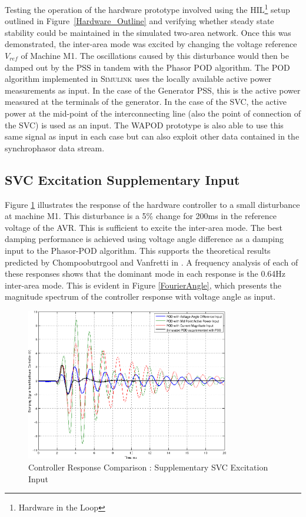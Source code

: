 \documentclass[journal]{IEEEtran}
\begin{document}
Testing the operation of the hardware prototype involved using the HIL\footnote{Hardware in the Loop} setup outlined in Figure~\ref{Hardware_Outline} and verifying whether steady state stability could be maintained in the simulated two-area network. Once this was demonstrated, the inter-area mode was excited by changing the voltage reference $V_{ref}$ of Machine M1. The oscillations caused by this disturbance would then be damped out by the PSS in tandem with the Phasor POD algorithm. The POD algorithm implemented in \textsc{Simulink} uses the locally available active power measurements as input. In the case of the Generator PSS, this is the active power measured at the terminals of the generator. In the case of the SVC, the active power at the mid-point of the interconnecting line (also the point of connection of the SVC) is used as an input. The WAPOD prototype is also able to use this same signal as input in each case but can also exploit other data contained in the synchrophasor data stream.

\subsection{SVC Excitation Supplementary Input}
Figure \ref{SVC_Plots} illustrates the response of the hardware controller to a small disturbance at machine M1. This disturbance is a 5\% change for 200ms in the reference voltage of the AVR. This is sufficient to excite the inter-area mode. The best damping performance is achieved using voltage angle difference as a damping input to the Phasor-POD algorithm. This supports the theoretical results predicted by Chompoobutrgool and Vanfretti in \cite{Yuwa}. A frequency analysis of each of these responses shows that the dominant mode in each response is the 0.64Hz inter-area mode. This is evident in Figure \ref{FourierAngle}, which presents the magnitude spectrum of the controller response with voltage angle as input.
\begin{figure}[!th]
\centering
\includegraphics[width=3.5in]{SVC_ResponseComparison_Labelled_NoVMag.png}
\caption{Controller Response Comparison : Supplementary SVC Excitation Input}
\label{SVC_Plots}
\end{figure}
\end{document}
